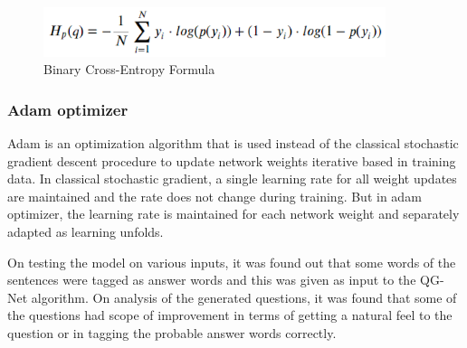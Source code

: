 \begin{figure}
	\caption{Binary Cross-Entropy Formula}
	\centering\includegraphics[width=10cm]{8.png}
\end{figure}

\subsubsection{Adam optimizer}
Adam is an optimization algorithm that is used instead of the classical
stochastic gradient descent procedure to update network weights iterative based
in training data. In classical stochastic gradient, a single learning rate for
all weight updates are maintained and the rate does not change during training.
But in adam optimizer, the learning rate is maintained for each network weight
and separately adapted as learning unfolds.

On testing the model on various inputs, it was found out that some words of the
sentences were tagged as answer words and this was given as input to the QG-Net
algorithm. On analysis of the generated questions, it was found that some of the
questions had scope of improvement in terms of getting a natural feel to the
question or in tagging the probable answer words correctly.

